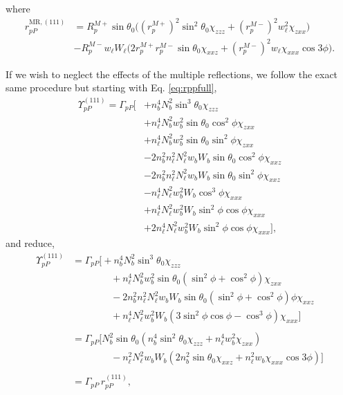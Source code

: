 where
\begin{equation}\label{eq:final-rpp.mr.111}
\begin{split}
r^{\mathrm{MR},(111)}_{pP} &= 
R^{M+}_{p}\sin\theta_{0}
\Big(
  \left(r^{M+}_{p}\right)^{2}\sin^{2}\theta_{0}\chi_{zzz}
+ \left(r^{M-}_{p}\right)^{2}w^{2}_{\ell}\chi_{zxx}
\Big)\\
&- R^{M-}_{p}w_{\ell}W_{\ell}
\Big(
  2r^{M+}_{p}r^{M-}_{p}\sin\theta_{0}\chi_{xxz}
+ \left(r^{M-}_{p}\right)^{2}w_{\ell}\chi_{xxx}\cos3\phi
\Big).
\end{split}
\end{equation}

If we wish to neglect the effects of the multiple reflections, we follow the
exact same procedure but starting with Eq. \eqref{eq:rppfull},
\begin{equation*}
\begin{split}
\Upsilon^{(111)}_{pP}
= \Gamma_{pP}
\big[
&+ n^{4}_{b}N^{2}_{b}\sin^{3}\theta_{0}\chi_{zzz}\\
&+ n^{4}_{\ell}N^{2}_{b}w^{2}_{b}\sin\theta_{0}\cos^{2}\phi\chi_{zxx}\\
&+ n^{4}_{\ell}N^{2}_{b}w^{2}_{b}\sin\theta_{0}\sin^{2}\phi\chi_{zxx}\\
&- 2n^{2}_{b}n^{2}_{\ell}N^{2}_{\ell}w_{b}W_{b}\sin\theta_{0}\cos^{2}\phi
  \chi_{xxz}\\
&- 2n^{2}_{b}n^{2}_{\ell}N^{2}_{\ell}w_{b}W_{b}\sin\theta_{0}\sin^{2}\phi
  \chi_{xxz}\\
&- n^{4}_{\ell}N^{2}_{\ell}w^{2}_{b}W_{b}\cos^{3}\phi\chi_{xxx}\\
&+ n^{4}_{\ell}N^{2}_{\ell}w^{2}_{b}W_{b}\sin^{2}\phi\cos\phi\chi_{xxx}\\
&+ 2n^{4}_{\ell}N^{2}_{\ell}w^{2}_{b}W_{b}\sin^{2}\phi\cos\phi\chi_{xxx}
\big],
\end{split}
\end{equation*}
and reduce,
\begin{equation*}
\begin{split}
\Upsilon^{(111)}_{pP} &=
\Gamma_{pP}
\big[
+ n^{4}_{b}N^{2}_{b}
   \sin^{3}\theta_{0}\chi_{zzz}\\
&\qquad\qquad+ n^{4}_{\ell}N^{2}_{b}w^{2}_{b}
   \sin\theta_{0}(\sin^{2}\phi + \cos^{2}\phi)\chi_{zxx}\\
&\qquad\qquad- 2n^{2}_{b}n^{2}_{\ell}N^{2}_{\ell}w_{b}W_{b}
   \sin\theta_{0}(\sin^{2}\phi + \cos^{2}\phi)\phi\chi_{xxz}\\
&\qquad\qquad+ n^{4}_{\ell}N^{2}_{\ell}w^{2}_{b}W_{b}
   (3\sin^{2}\phi\cos\phi - \cos^{3}\phi)\chi_{xxx}
\big]\\\\
&=
\Gamma_{pP}
\big[
N^{2}_{b}\sin\theta_{0}(n^{4}_{b}\sin^{2}\theta_{0}\chi_{zzz} 
+ n^{4}_{\ell}w^{2}_{b}\chi_{zxx})\\
&\qquad\qquad- n^{2}_{\ell}N^{2}_{\ell}w_{b}W_{b}(2n^{2}_{b}\sin\theta_{0}
\chi_{xxz} 
 + n^{2}_{\ell}w_{b}\chi_{xxx}\cos3\phi)
\big]\\\\
&= \Gamma_{pP}\,r^{(111)}_{pP},
\end{split}
\end{equation*}
